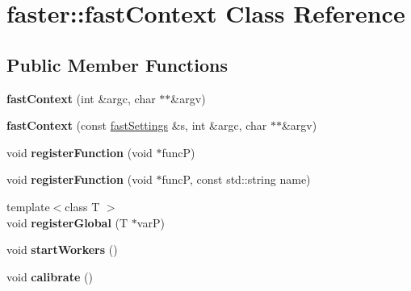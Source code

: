 \hypertarget{classfaster_1_1fastContext}{}\section{faster\+:\+:fast\+Context Class Reference}
\label{classfaster_1_1fastContext}
\subsection*{Public Member Functions}
\begin{DoxyCompactItemize}
\item 
\hypertarget{classfaster_1_1fastContext_a8e4531e2352a60246205ba69969f1f6b}{}{\bfseries fast\+Context} (int \&argc, char $\ast$$\ast$\&argv)\label{classfaster_1_1fastContext_a8e4531e2352a60246205ba69969f1f6b}

\item 
\hypertarget{classfaster_1_1fastContext_a961ba8c8ffa9a9b4634e6d6bb4d685ea}{}{\bfseries fast\+Context} (const \hyperlink{classfaster_1_1fastSettings}{fast\+Settings} \&s, int \&argc, char $\ast$$\ast$\&argv)\label{classfaster_1_1fastContext_a961ba8c8ffa9a9b4634e6d6bb4d685ea}

\item 
\hypertarget{classfaster_1_1fastContext_a78d8eec46a44c600adb554bcdf8d8a2c}{}void {\bfseries register\+Function} (void $\ast$func\+P)\label{classfaster_1_1fastContext_a78d8eec46a44c600adb554bcdf8d8a2c}

\item 
\hypertarget{classfaster_1_1fastContext_add296b9632bef0f4ceddbdc02a874bb4}{}void {\bfseries register\+Function} (void $\ast$func\+P, const std\+::string name)\label{classfaster_1_1fastContext_add296b9632bef0f4ceddbdc02a874bb4}

\item 
\hypertarget{classfaster_1_1fastContext_a21c563c0ba6075a6dc31faf14dccb165}{}{\footnotesize template$<$class T $>$ }\\void {\bfseries register\+Global} (T $\ast$var\+P)\label{classfaster_1_1fastContext_a21c563c0ba6075a6dc31faf14dccb165}

\item 
\hypertarget{classfaster_1_1fastContext_a1f6b1c1a940d67b434ac95bad4770508}{}void {\bfseries start\+Workers} ()\label{classfaster_1_1fastContext_a1f6b1c1a940d67b434ac95bad4770508}

\item 
\hypertarget{classfaster_1_1fastContext_a3dd0172c18a37d863adf28b794020e5c}{}void {\bfseries calibrate} ()\label{classfaster_1_1fastContext_a3dd0172c18a37d863adf28b794020e5c}


\end{DoxyCompactItemize}
